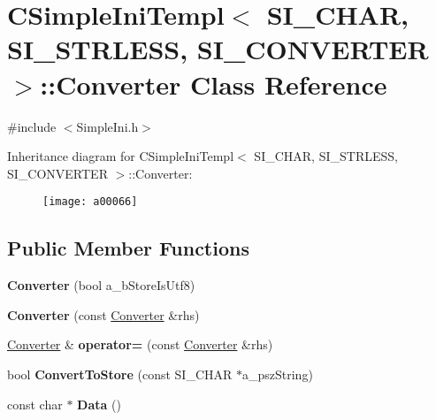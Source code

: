 \hypertarget{a00066}{}\section{C\+Simple\+Ini\+Templ$<$ S\+I\+\_\+\+C\+H\+AR, S\+I\+\_\+\+S\+T\+R\+L\+E\+SS, S\+I\+\_\+\+C\+O\+N\+V\+E\+R\+T\+ER $>$\+:\+:Converter Class Reference}
\label{a00066}


{\ttfamily \#include $<$Simple\+Ini.\+h$>$}

Inheritance diagram for C\+Simple\+Ini\+Templ$<$ S\+I\+\_\+\+C\+H\+AR, S\+I\+\_\+\+S\+T\+R\+L\+E\+SS, S\+I\+\_\+\+C\+O\+N\+V\+E\+R\+T\+ER $>$\+:\+:Converter\+:\begin{figure}[H]
\begin{center}
\leavevmode
\texttt{[image: a00066]}
\end{center}
\end{figure}
\subsection*{Public Member Functions}
\begin{DoxyCompactItemize}
\item 
{\bfseries Converter} (bool a\+\_\+b\+Store\+Is\+Utf8)\hypertarget{a00066_ab8e740b211e4ece127d4d25773ba7e42}{}\label{a00066_ab8e740b211e4ece127d4d25773ba7e42}

\item 
{\bfseries Converter} (const \hyperlink{a00066}{Converter} \&rhs)\hypertarget{a00066_a2f6e993014ed5d60c6e890e55beb0805}{}\label{a00066_a2f6e993014ed5d60c6e890e55beb0805}

\item 
\hyperlink{a00066}{Converter} \& {\bfseries operator=} (const \hyperlink{a00066}{Converter} \&rhs)\hypertarget{a00066_af858c01c6a7e4ce9fafd18abc9e0ac1b}{}\label{a00066_af858c01c6a7e4ce9fafd18abc9e0ac1b}

\item 
bool {\bfseries Convert\+To\+Store} (const S\+I\+\_\+\+C\+H\+AR $\ast$a\+\_\+psz\+String)\hypertarget{a00066_a4e4186867214b54326cf622e323c9f2f}{}\label{a00066_a4e4186867214b54326cf622e323c9f2f}

\item 
const char $\ast$ {\bfseries Data} ()\hypertarget{a00066_a918bbd4f861a2872e148bc9481ac80bb}{}\label{a00066_a918bbd4f861a2872e148bc9481ac80bb}

\end{DoxyCompactItemize}


